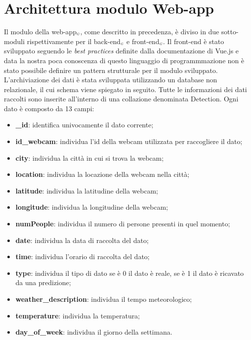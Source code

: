 \section{Architettura modulo Web-app}\label{ArchitetturaModuloWebApp}
Il modulo della web-app$_{\scaleto{G}{3pt}}$, come descritto in precedenza, è diviso in due sotto-moduli rispettivamente per il back-end$_{\scaleto{G}{3pt}}$ e front-end$_{\scaleto{G}{3pt}}$.
Il front-end è stato sviluppato seguendo le \textit{best practices} definite dalla documentazione di Vue.js e data la nostra poca conoscenza di questo linguaggio di programmmazione non è stato possibile definire un pattern strutturale per il modulo sviluppato.
L'archiviazione dei dati è stata sviluppata utilizzando un database non relazionale, il cui schema viene spiegato in seguito. Tutte le informazioni dei dati raccolti sono inserite all'interno di una collazione denominata Detection. Ogni dato è composto da 13 campi:
\begin{itemize}
	\item \textbf{\_id}: identifica univocamente il dato corrente;
	\item \textbf{id\_webcam}: individua l'id della webcam utilizzata per raccogliere il dato;
	\item \textbf{city}: individua la città in cui si trova la webcam;
	\item \textbf{location}: individua la locazione della webcam nella città;
	\item \textbf{latitude}: individua la latitudine della webcam;
	\item \textbf{longitude}: individua la longitudine della webcam;
	\item \textbf{numPeople}: individua il numero di persone presenti in quel momento;
	\item \textbf{date}: individua la data di raccolta del dato;
	\item \textbf{time}: individua l'orario di raccolta del dato;
	\item \textbf{type}: individua il tipo di dato se è 0 il dato è reale, se è 1 il dato è ricavato da una predizione;
	\item \textbf{weather\_description}: individua il tempo meteorologico;
	\item \textbf{temperature}: individua la temperatura;
	\item \textbf{day\_of\_week}: individua il giorno della settimana.
\end{itemize}
